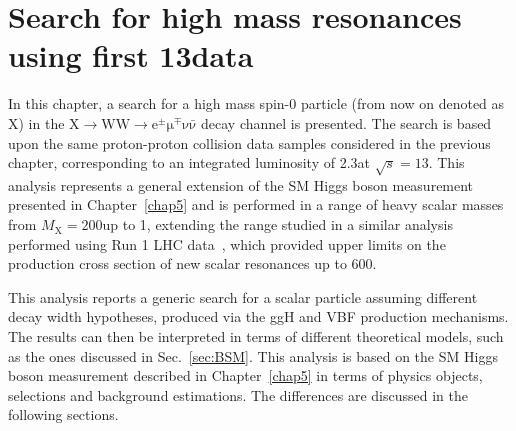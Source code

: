\chapter[Search for high mass resonances using first \boldmath$13\TeV$ data]{Search for high mass resonances using first 13\TeV data}\label{chap6}
\thispagestyle{empty}

In this chapter, a search for a high mass spin-0 particle (from now on denoted as X) in the $\mathrm{X\to WW \to e^{\pm}\mu^{\mp}\nu\bar{\nu}}$ decay channel is presented. 
The search is based upon the same proton-proton collision data samples considered in the previous chapter, corresponding to an integrated luminosity of 2.3\ifb  at $\sqrt{s} = 13$\TeV. This analysis represents a general extension of the SM Higgs boson measurement presented in Chapter~\ref{chap5} and is performed in a range of heavy scalar masses from $M_\mathrm{X} = 200$\GeV up to 1\TeV, extending the range studied in a similar analysis performed using Run 1 LHC data~\cite{Khachatryan:2015cwa}, which provided upper limits on the production cross section of new scalar resonances up to 600\GeV.


This analysis reports a generic search for a scalar particle assuming different decay width hypotheses, produced via the ggH and VBF production mechanisms. The results can then be interpreted in terms of different theoretical models, such as the ones discussed in Sec.~\ref{sec:BSM}. This analysis is based on the SM Higgs boson measurement described in Chapter~\ref{chap5} in terms of physics objects, selections and background estimations. The differences are discussed in the following sections.


